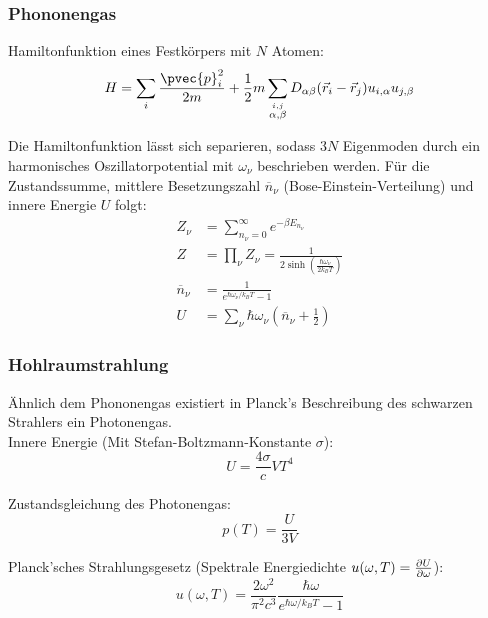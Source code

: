 \documentclass[11pt]{article}
\numberwithin{equation}{section}
\begin{document}
      \subsubsection{Phononengas}
        Hamiltonfunktion eines Festkörpers mit $N$ Atomen:
        \begin{equation}
          H=\sum_i \frac{\pvec{p}_i^2}{2m} + \frac{1}{2}m\sum_{\stackrel{i,j}{\alpha,\beta}} D_{\alpha\beta}(\vec{r}_i - \vec{r}_j)u_{i,\alpha}u_{j,\beta}
        \end{equation}

        Die Hamiltonfunktion lässt sich separieren, sodass $3N$ Eigenmoden durch ein harmonisches Oszillatorpotential mit $\omega_\nu$ beschrieben werden. Für die Zustandssumme, mittlere Besetzungszahl $\overline{n}_\nu$ (Bose-Einstein-Verteilung) und innere Energie $U$ folgt:
        \begin{equation}
          \begin{aligned}
            Z_\nu &= \sum_{n_\nu=0}^\infty e^{-\beta E_{n_\nu}} \\
            Z &= \prod_\nu Z_\nu = \frac{1}{2\sinh{\left( \frac{\hbar\omega_\nu}{2 k_B T} \right)}} \\
            \overline{n}_\nu &= \frac{1}{e^{\hbar\omega_\nu/k_B T} - 1} \\
            U &= \sum_\nu \hbar\omega_\nu \left(\overline{n}_\nu + \frac{1}{2}\right)
          \end{aligned}
        \end{equation}

      \subsubsection{Hohlraumstrahlung}
        Ähnlich dem Phononengas existiert in Planck's Beschreibung des schwarzen Strahlers ein Photonengas. \\

        Innere Energie (Mit Stefan-Boltzmann-Konstante $\sigma$):
        \begin{equation}
          U = \frac{4\sigma}{c} V T^4
        \end{equation}

        Zustandsgleichung des Photonengas:
        \begin{equation}
          p(T) = \frac{U}{3V}
        \end{equation}

        Planck'sches Strahlungsgesetz (Spektrale Energiedichte $u(\omega,T) = \frac{\partial U}{\partial \omega}$):
        \begin{equation}
          u(\omega,T) = \frac{2 \omega^2}{\pi^2 c^3} \frac{\hbar \omega}{e^{\hbar \omega / k_B T} - 1}
        \end{equation}
\end{document}

